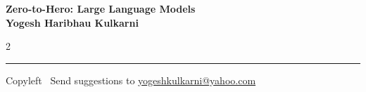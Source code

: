 \documentclass[8pt,landscape]{article}
\begin{document}
\footnotesize


\begin{center}
\Large{\textbf{Zero-to-Hero: Large Language Models\\ Yogesh Haribhau Kulkarni}}
\end{center}

\begin{multicols}{2}

\end{multicols}

\rule{\linewidth}{0.25pt}
\scriptsize
Copyleft \textcopyleft\  Send suggestions to
\href{http://www.yogeshkulkarni.com}{yogeshkulkarni@yahoo.com}
\end{document}
